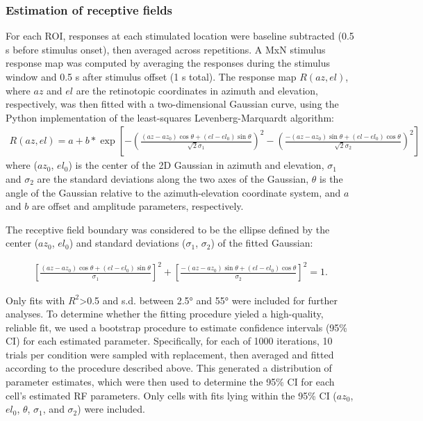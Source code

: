 \subsubsection{Estimation of receptive fields}
For each ROI, responses at each stimulated location were baseline subtracted (0.5 s before stimulus onset), then averaged across repetitions\cite{Marques2018}. A MxN stimulus response map was computed by averaging the responses during the stimulus window and 0.5 s after stimulus offset (1 s total). The response map $R(az, el)$, where $az$ and $el$ are the retinotopic coordinates in azimuth and elevation, respectively, was then fitted with a two-dimensional Gaussian curve, using the Python implementation of the least-squares Levenberg-Marquardt algorithm\cite{More1978, Virtanen2020}:
\begin{align}
R(az, el) = a +b*\exp\left[ -\left( \frac{(az-az_0)\cos\theta + (el-el_0)\sin\theta}{\sqrt{2} \sigma_1} \right)^2-\left( \frac{-(az-az_0)\sin\theta+(el-el_0)\cos\theta}{\sqrt{2}\sigma_2} \right)^2 \right] 
\end{align}
where ($az_0$, $el_0$) is the center of the 2D Gaussian in azimuth and elevation, $\sigma_1$ and $\sigma_2$ are the standard deviations along the two axes of the Gaussian, $\theta$ is the angle of the Gaussian relative to the azimuth-elevation coordinate system, and $a$ and $b$ are offset and amplitude parameters, respectively. 

The receptive field boundary was considered to be the ellipse defined by the center ($az_0$, $el_0$) and standard deviations ($\sigma_1$, $\sigma_2$) of the fitted Gaussian:

\begin{align}
\left[ \frac{(az-az_0)\cos\theta + (el-el_0)\sin\theta}{\sigma_1} \right]^2 + \left[ \frac{-(az-az_0)\sin\theta + (el-el_0)\cos\theta}{\sigma_2} \right]^2 = 1.
\end{align}

Only fits with $R^2$>0.5 and s.d. between \ang{2.5} and \ang{55} were included for further analyses. To determine whether the fitting procedure yieled a high-quality, reliable fit, we used a bootstrap procedure to estimate confidence intervals (95\% CI) for each estimated parameter. Specifically, for each of 1000 iterations, 10 trials per condition were sampled with replacement, then averaged and fitted according to the procedure described above. This generated a distribution of parameter estimates, which were then used to determine the 95\% CI for each cell's estimated RF parameters. Only cells with fits lying within the 95\% CI ($az_0$, $el_0$, $\theta$, $\sigma_1$, and $\sigma_2$) were included.

